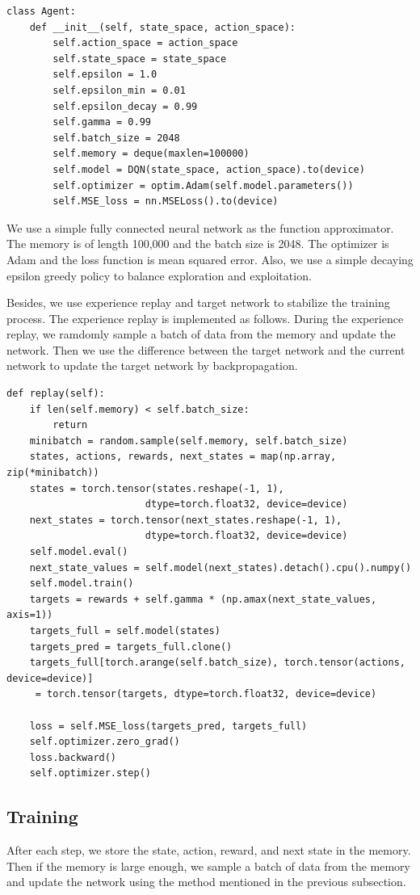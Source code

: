 \begin{verbatim}
class Agent:
    def __init__(self, state_space, action_space):
        self.action_space = action_space 
        self.state_space = state_space
        self.epsilon = 1.0
        self.epsilon_min = 0.01
        self.epsilon_decay = 0.99
        self.gamma = 0.99
        self.batch_size = 2048
        self.memory = deque(maxlen=100000)
        self.model = DQN(state_space, action_space).to(device)
        self.optimizer = optim.Adam(self.model.parameters())
        self.MSE_loss = nn.MSELoss().to(device)
\end{verbatim}
We use a simple fully connected neural network as the function approximator. The memory is of length 100,000 and the batch size is 2048. The optimizer is Adam and the loss function is mean squared error. Also, we use a simple decaying epsilon greedy policy to balance exploration and exploitation.

Besides, we use experience replay and target network to stabilize the training process. The experience replay is implemented as follows. During the experience replay, we ramdomly sample a batch of data from the memory and update the network. Then we use the difference between the target network and the current network to update the target network by backpropagation.
\begin{verbatim}
def replay(self):
    if len(self.memory) < self.batch_size:
        return
    minibatch = random.sample(self.memory, self.batch_size)
    states, actions, rewards, next_states = map(np.array, zip(*minibatch))
    states = torch.tensor(states.reshape(-1, 1), 
                        dtype=torch.float32, device=device)
    next_states = torch.tensor(next_states.reshape(-1, 1), 
                        dtype=torch.float32, device=device)
    self.model.eval()
    next_state_values = self.model(next_states).detach().cpu().numpy()
    self.model.train()
    targets = rewards + self.gamma * (np.amax(next_state_values, axis=1)) 
    targets_full = self.model(states)
    targets_pred = targets_full.clone()
    targets_full[torch.arange(self.batch_size), torch.tensor(actions, device=device)]
     = torch.tensor(targets, dtype=torch.float32, device=device)

    loss = self.MSE_loss(targets_pred, targets_full)
    self.optimizer.zero_grad()
    loss.backward()
    self.optimizer.step()
\end{verbatim}

\subsection{Training}
After each step, we store the state, action, reward, and next state in the memory. Then if the memory is large enough, we sample a batch of data from the memory and update the network using the method mentioned in the previous subsection. 

